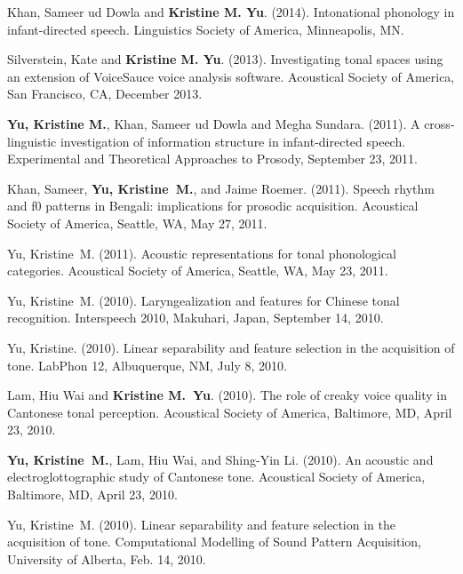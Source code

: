 \documentclass[10pt]{article}
\begin{document}
\begin{bibenum}

\item Khan, Sameer ud Dowla and \textbf{Kristine M. Yu}. (2014). Intonational phonology
  in infant-directed speech. Linguistics Society of America, Minneapolis, MN.

\item Silverstein, Kate and \textbf{Kristine M. Yu}. (2013). Investigating
  tonal spaces using an extension of VoiceSauce voice analysis
  software. Acoustical Society of America, San Francisco, CA, December 2013.

\item \textbf{Yu, Kristine M.}, Khan, Sameer ud Dowla and Megha Sundara. (2011). A cross-linguistic
investigation of information structure in infant-directed
speech. Experimental and Theoretical Approaches to Prosody, September 23, 2011.

\item Khan, Sameer, \textbf{Yu, Kristine~M.}, and Jaime Roemer. (2011). Speech rhythm and f0 patterns
in Bengali: implications for prosodic acquisition. Acoustical
Society of America, Seattle, WA, May 27, 2011.

\item Yu, Kristine~M. (2011). Acoustic representations for tonal phonological
categories. Acoustical Society of America, Seattle, WA, May
23, 2011.

\item Yu, Kristine~M. (2010). Laryngealization and features for Chinese tonal
recognition. Interspeech 2010, Makuhari, Japan, September 14, 2010.

\item Yu, Kristine. (2010). Linear separability and feature selection in the
acquisition of tone. LabPhon 12, Albuquerque, NM, July 8, 2010.

\item Lam, Hiu Wai and \textbf{Kristine M.~Yu}. (2010). The role of creaky voice quality in {C}antonese
tonal perception. Acoustical Society of America, Baltimore,
MD, April 23, 2010.

\item \textbf{Yu, Kristine~M.}, Lam, Hiu Wai, and Shing-Yin Li. (2010). An acoustic and
electroglottographic study of {C}antonese tone. Acoustical
Society of America, Baltimore, MD, April 23, 2010.

\item Yu, Kristine~M. (2010). Linear separability and feature selection in the
acquisition of tone. Computational Modelling of Sound Pattern
Acquisition, University of Alberta, Feb. 14, 2010.


\end{bibenum}
\end{document}
